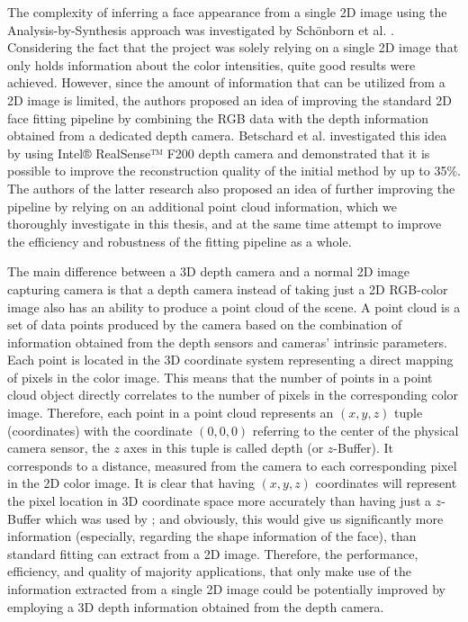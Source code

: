 The complexity of inferring a face appearance from a single 2D image using the Analysis-by-Synthesis approach was investigated by Sch{\"o}nborn et al. \cite{Schoenborn2014, Schoenborn2017, 10.1007/978-3-642-40602-7_11}. Considering the fact that the project was solely relying on a single 2D image that only holds information about the color intensities, quite good results were achieved. However, since the amount of information that can be utilized from a 2D image is limited, the authors proposed an idea of improving the standard 2D face fitting pipeline by combining the RGB data with the depth information obtained from a dedicated depth camera. Betschard et al. \cite{betschard2016} investigated this idea by using Intel® RealSense™ F200 depth camera and demonstrated that it is possible to improve the reconstruction quality of the initial method by up to 35\%. The authors of the latter research also proposed an idea of further improving the pipeline by relying on an additional point cloud information, which we thoroughly investigate in this thesis, and at the same time attempt to improve the efficiency and robustness of the fitting pipeline as a whole.\bigskip

The main difference between a 3D depth camera and a normal 2D image capturing camera is that a depth camera instead of taking just a 2D RGB-color image also has an ability to produce a point cloud of the scene. A point cloud is a set of data points produced by the camera based on the combination of information obtained from the depth sensors and cameras' intrinsic parameters. Each point is located in the 3D coordinate system representing a direct mapping of pixels in the color image. This means that the number of points in a point cloud object directly correlates to the number of pixels in the corresponding color image. Therefore, each point in a point cloud represents an $(x, y, z)$ tuple (coordinates) with the coordinate $(0, 0, 0)$ referring to the center of the physical camera sensor\cite{rs-projection}, the $z$ axes in this tuple is called depth (or $z$-Buffer). It corresponds to a distance, measured from the camera to each corresponding pixel in the 2D color image. It is clear that having $(x, y, z)$ coordinates will represent the pixel location in 3D coordinate space more accurately than having just a $z$-Buffer which was used by \cite{betschard2016}; and obviously, this would give us significantly more information (especially, regarding the shape information of the face), than standard fitting can extract from a 2D image. Therefore, the performance, efficiency, and quality of majority applications, that only make use of the information extracted from a single 2D image could be potentially improved by employing a 3D depth information obtained from the depth camera. \bigskip

